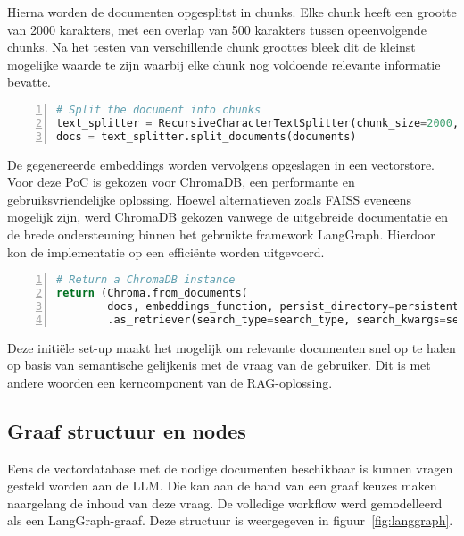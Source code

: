 Hierna worden de documenten opgesplitst in chunks. Elke chunk heeft een grootte van 2000 karakters, met een overlap van 500 karakters tussen opeenvolgende chunks. Na het testen van verschillende chunk groottes bleek dit de kleinst mogelijke waarde te zijn waarbij elke chunk nog voldoende relevante informatie bevatte.

\begin{lstlisting}[basicstyle=\small, frame=single, breaklines=true, postbreak=\mbox{\textcolor{red}{$\hookrightarrow$}\space}, escapeinside ={\%,}, escapechar={!}, numbers=left, language=Python, caption=Definiëren van tekstsplitter] 
# Split the document into chunks
text_splitter = RecursiveCharacterTextSplitter(chunk_size=2000, chunk_overlap=500)
docs = text_splitter.split_documents(documents)
\end{lstlisting}

De gegenereerde embeddings worden vervolgens opgeslagen in een vectorstore. Voor deze PoC is gekozen voor ChromaDB, een performante en gebruiksvriendelijke oplossing. Hoewel alternatieven zoals FAISS eveneens mogelijk zijn, werd ChromaDB gekozen vanwege de uitgebreide documentatie en de brede ondersteuning binnen het gebruikte framework LangGraph. Hierdoor kon de implementatie op een efficiënte worden uitgevoerd.

\begin{lstlisting}[basicstyle=\small, frame=single, breaklines=true, postbreak=\mbox{\textcolor{red}{$\hookrightarrow$}\space}, escapeinside ={\%,}, escapechar={!}, numbers=left, language=Python, caption=Aanmaken ChromaDB instantie]
# Return a ChromaDB instance
return (Chroma.from_documents(
        docs, embeddings_function, persist_directory=persistent_directory)
        .as_retriever(search_type=search_type, search_kwargs=search_kwargs))
\end{lstlisting}

Deze initiële set-up maakt het mogelijk om relevante documenten snel op te halen op basis van semantische gelijkenis met de vraag van de gebruiker. Dit is met andere woorden een kerncomponent van de RAG-oplossing.

\subsection{Graaf structuur en nodes}

Eens de vectordatabase met de nodige documenten beschikbaar is kunnen vragen gesteld worden aan de LLM. Die kan aan de hand van een graaf keuzes maken naargelang de inhoud van deze vraag. De volledige workflow werd gemodelleerd als een LangGraph-graaf. Deze structuur is weergegeven in figuur~\ref{fig:langgraph}.


